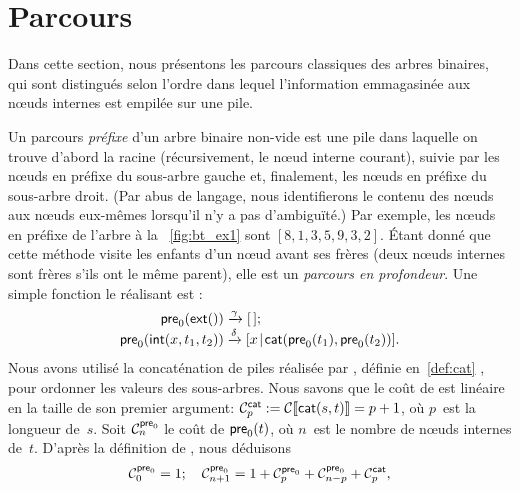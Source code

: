 \section{Parcours}
\label{sec:traversals}

Dans cette section, nous présentons les parcours classiques des arbres
binaires, qui sont distingués selon l'ordre dans lequel l'information
emmagasinée aux nœuds internes est empilée sur une pile.

\label{preorder}

Un parcours \emph{préfixe} d'un arbre
binaire non-vide est une pile dans laquelle on trouve d'abord la
racine (récursivement, le nœud interne courant), suivie par les
nœuds en préfixe du sous-arbre gauche et, finalement, les
nœuds en préfixe du sous-arbre droit. (Par abus de langage, nous
identifierons le contenu des nœuds aux nœuds eux-mêmes
lorsqu'il n'y a pas d'ambiguïté.) Par exemple, les nœuds en
préfixe de l'arbre à la \fig~\vref{fig:bt_ex1} sont
\([8,1,3,5,9,3,2]\). Étant donné que cette méthode visite les enfants
d'un nœud avant ses frères (deux
nœuds internes sont frères s'ils ont le même parent), elle est un
\emph{parcours en profondeur}. Une simple fonction le réalisant est :
\begin{align}
\fun{pre}_0(\fun{ext}()) &\xrightarrow{\smash{\gamma}} \el; \nonumber\\
\fun{pre}_0(\fun{int}(x,t_1,t_2)) &\xrightarrow{\smash{\delta}}
\cons{x}{\fun{cat}(\fun{pre}_0(t_1),\fun{pre}_0(t_2))}.
\label{eq:pre0}
\index{pre0@\fun{pre\(_0\)/1}}
\end{align}
Nous avons utilisé la concaténation de piles
réalisée par , définie
en~\eqref{def:cat} , pour ordonner les valeurs des
sous-arbres. Nous savons que le coût de  est linéaire en la
taille de son premier argument: \(\C{\fun{cat}}{p} :=
\Call{\fun{cat}(s,t)} = p+1\), où \(p\)~est la longueur de~\(s\). Soit
\(\C{\fun{pre}_0}{n}\) le coût de
\(\fun{pre}_0(t)\), où \(n\)~est le nombre de nœuds internes
de~\(t\). D'après la définition de , nous déduisons
\begin{equation*}
\C{\fun{pre}_0}{0} = 1;\quad
\C{\fun{pre}_0}{n+1} =
  1 + \C{\fun{pre}_0}{p} + \C{\fun{pre}_0}{n-p} + \C{\fun{cat}}{p},
\index{pre0@$\C{\fun{pre}_0}{n}$}
\end{equation*}
